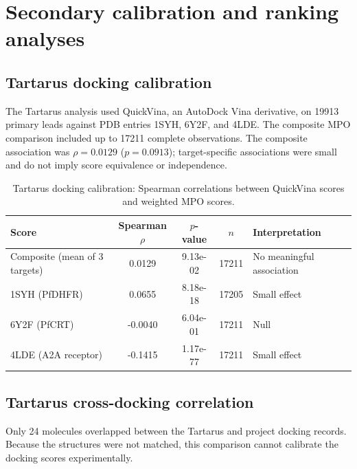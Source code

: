 \section*{Secondary calibration and ranking analyses}

\subsection*{Tartarus docking calibration}\label{tab:secondary_tartarus_calibration_section}

The Tartarus analysis used QuickVina\citep{quickvina_2019}, an AutoDock Vina\citep{vina_2021} derivative, on \num{19913} primary leads against PDB entries 1SYH, 6Y2F, and 4LDE. The composite MPO comparison included up to \num{17211} complete observations. The composite association was $\rho=\num{0.0129}$ ($p=\num{0.0913}$); target-specific associations were small and do not imply score equivalence or independence.

\begin{table}[htbp]
\centering
\caption{Tartarus docking calibration: Spearman correlations between QuickVina scores and weighted MPO scores.}
\label{tab:secondary_tartarus_calibration}
\begin{tabularx}{\textwidth}{>{\raggedright\arraybackslash}X S[table-format=-1.4] S[table-format=1.2e2] S[table-format=5.0] >{\raggedright\arraybackslash}X}
\toprule
Score & {Spearman $\rho$} & {$p$-value} & {$n$} & {Interpretation} \\
\midrule
Composite (mean of 3 targets) & 0.0129 & 9.13e-02 & 17211 & No meaningful association \\
1SYH (PfDHFR) & 0.0655 & 8.18e-18 & 17205 & Small effect \\
6Y2F (PfCRT) & -0.0040 & 6.04e-01 & 17211 & Null \\
4LDE (A2A receptor) & -0.1415 & 1.17e-77 & 17211 & Small effect \\
\bottomrule
\end{tabularx}
\end{table}

\subsection*{Tartarus cross-docking correlation}\label{tab:secondary_tartarus_correlation_section}

Only \num{24} molecules overlapped between the Tartarus and project docking records. Because the structures were not matched, this comparison cannot calibrate the docking scores experimentally.

